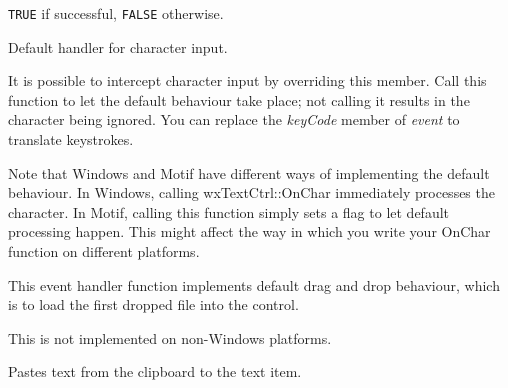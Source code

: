 


{\tt TRUE} if successful, {\tt FALSE} otherwise.

\label{wxtextctrlonchar}


Default handler for character input.


It is possible to intercept character
input by overriding this member. Call this function
to let the default behaviour take place; not calling
it results in the character being ignored. You can
replace the {\it keyCode} member of {\it event} to
translate keystrokes.

Note that Windows and Motif have different ways
of implementing the default behaviour. In Windows,
calling wxTextCtrl::OnChar immediately
processes the character. In Motif,
calling this function simply sets a flag
to let default processing happen. This might affect
the way in which you write your OnChar function
on different platforms.



\label{wxtextctrlondropfiles}


This event handler function implements default drag and drop behaviour, which
is to load the first dropped file into the control.




This is not implemented on non-Windows platforms.



\label{wxtextctrlpaste}


Pastes text from the clipboard to the text item.

\label{wxtextctrlpositiontoxy}

